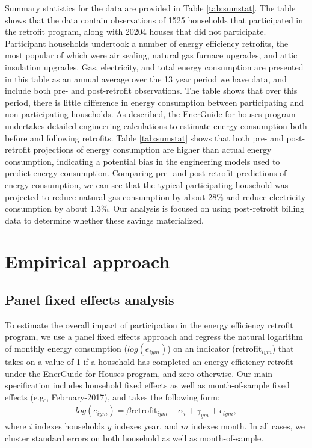 \documentclass{article}
\begin{document}
Summary statistics for the data are provided in Table \ref{tab:sumstat}. The table shows that the data contain observations of 1525 households that participated in the retrofit program, along with 20204 houses that did not participate.  Participant households undertook a number of energy efficiency retrofits, the most popular of which were air sealing, natural gas furnace upgrades, and attic insulation upgrades.  Gas, electricity, and total energy consumption are presented in this table as an annual average over the 13 year period we have data, and include both pre- and post-retrofit observations. The table shows that over this period, there is little difference in energy consumption between participating and non-participating households. As described, the EnerGuide for houses program undertakes detailed engineering calculations to estimate energy consumption both before and following retrofits. Table \ref{tab:sumstat} shows that both pre- and post-retrofit projections of energy consumption are higher than actual energy consumption, indicating a potential bias in the engineering models used to predict energy consumption. Comparing pre- and post-retrofit predictions of energy consumption, we can see that the typical participating household was projected to reduce natural gas consumption by about 28\% and reduce electricity consumption by about 1.3\%. Our analysis is focused on using post-retrofit billing data to determine whether these savings materialized.






\section{Empirical approach}

\subsection{Panel fixed effects analysis}
To estimate the overall impact of participation in the energy efficiency retrofit program, we use a panel fixed effects approach and regress the natural logarithm of monthly energy consumption ($log(e_{iym})$) on an indicator ($\text{retrofit}_{iym}$) that takes on a value of 1 if a household has completed an energy efficiency retrofit under the EnerGuide for Houses program, and zero otherwise. Our main specification includes household fixed effects as well as month-of-sample fixed effects (e.g., February-2017), and takes the following form:
\begin{align}
	log(e_{iym}) = \beta \text{retrofit}_{iym} + \alpha_i + \gamma_{ym} + \epsilon_{iym},
\end{align}
where $i$ indexes households $y$ indexes year, and $m$ indexes month. In all cases, we cluster standard errors on both household as well as month-of-sample.
\end{document}
